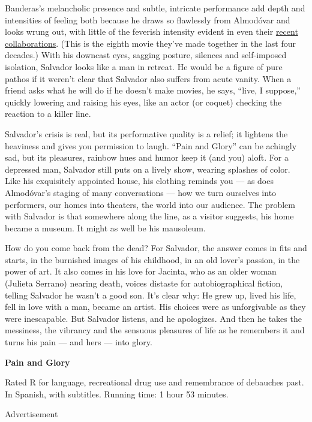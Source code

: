 Banderas's melancholic presence and subtle, intricate performance add
depth and intensities of feeling both because he draws so flawlessly
from Almodóvar and looks wrung out, with little of the feverish
intensity evident in even their
\href{https://www.nytimes.com/2011/10/14/movies/the-skin-i-live-in-directed-by-pedro-almodovar-review.html}{recent
collaborations}. (This is the eighth movie they've made together in the
last four decades.) With his downcast eyes, sagging posture, silences
and self-imposed isolation, Salvador looks like a man in retreat. He
would be a figure of pure pathos if it weren't clear that Salvador also
suffers from acute vanity. When a friend asks what he will do if he
doesn't make movies, he says, ``live, I suppose,'' quickly lowering and
raising his eyes, like an actor (or coquet) checking the reaction to a
killer line.

Salvador's crisis is real, but its performative quality is a relief; it
lightens the heaviness and gives you permission to laugh. ``Pain and
Glory'' can be achingly sad, but its pleasures, rainbow hues and humor
keep it (and you) aloft. For a depressed man, Salvador still puts on a
lively show, wearing splashes of color. Like his exquisitely appointed
house, his clothing reminds you --- as does Almodóvar's staging of many
conversations --- how we turn ourselves into performers, our homes into
theaters, the world into our audience. The problem with Salvador is that
somewhere along the line, as a visitor suggests, his home became a
museum. It might as well be his mausoleum.

How do you come back from the dead? For Salvador, the answer comes in
fits and starts, in the burnished images of his childhood, in an old
lover's passion, in the power of art. It also comes in his love for
Jacinta, who as an older woman (Julieta Serrano) nearing death, voices
distaste for autobiographical fiction, telling Salvador he wasn't a good
son. It's clear why: He grew up, lived his life, fell in love with a
man, became an artist. His choices were as unforgivable as they were
inescapable. But Salvador listens, and he apologizes. And then he takes
the messiness, the vibrancy and the sensuous pleasures of life as he
remembers it and turns his pain --- and hers --- into glory.

\textbf{Pain and Glory}

Rated R for language, recreational drug use and remembrance of debauches
past. In Spanish, with subtitles. Running time: 1 hour 53 minutes.

Advertisement

